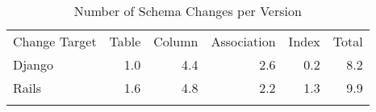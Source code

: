 



\begin{table}
\caption{Number of Schema Changes per Version}
\label{tab:change-stat}
\centering
\begin{tabular}{lrrrrr}
\arrayrulecolor{black}\hline  
\arrayrulecolor{black}\hline
Change Target  & Table  & Column  & Association  & Index  & Total \\
\arrayrulecolor{black}\hline
Django & 1.0           & 4.4            & 2.6                & 0.2     & 8.2      \\
Rails  & 1.6           & 4.8            & 2.2                & 1.3  & 9.9     \\   
\arrayrulecolor{black}\hline  
\arrayrulecolor{black}\hline
\end{tabular}


\end{table}



